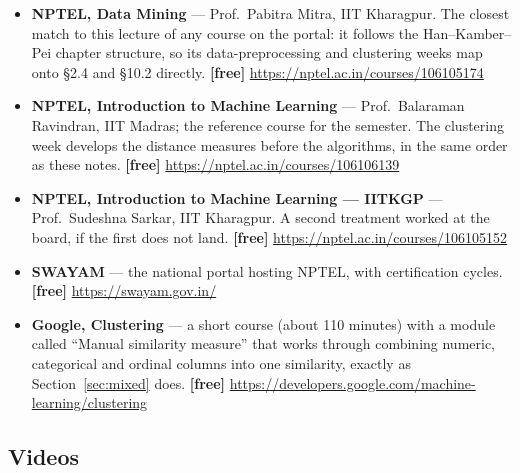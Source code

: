 \documentclass[11pt]{article}
\begin{document}
\begin{sloppypar}
\begin{itemize}[leftmargin=*]
  \item \textbf{NPTEL, Data Mining} --- Prof.\ Pabitra Mitra, IIT Kharagpur.
    The closest match to this lecture of any course on the portal: it follows
    the Han--Kamber--Pei chapter structure, so its data-preprocessing and
    clustering weeks map onto \S2.4 and \S10.2 directly. \textbf{[free]}
    \url{https://nptel.ac.in/courses/106105174}
  \item \textbf{NPTEL, Introduction to Machine Learning} --- Prof.\ Balaraman
    Ravindran, IIT Madras; the reference course for the semester. The
    clustering week develops the distance measures before the algorithms, in
    the same order as these notes. \textbf{[free]}
    \url{https://nptel.ac.in/courses/106106139}
  \item \textbf{NPTEL, Introduction to Machine Learning --- IITKGP} ---
    Prof.\ Sudeshna Sarkar, IIT Kharagpur. A second treatment worked at the
    board, if the first does not land. \textbf{[free]}
    \url{https://nptel.ac.in/courses/106105152}
  \item \textbf{SWAYAM} --- the national portal hosting NPTEL, with
    certification cycles. \textbf{[free]} \url{https://swayam.gov.in/}
  \item \textbf{Google, Clustering} --- a short course (about 110 minutes)
    with a module called ``Manual similarity measure'' that works through
    combining numeric, categorical and ordinal columns into one similarity,
    exactly as Section~\ref{sec:mixed} does. \textbf{[free]}
    \url{https://developers.google.com/machine-learning/clustering}
\end{itemize}
\end{sloppypar}

\subsection*{Videos}
\end{document}
